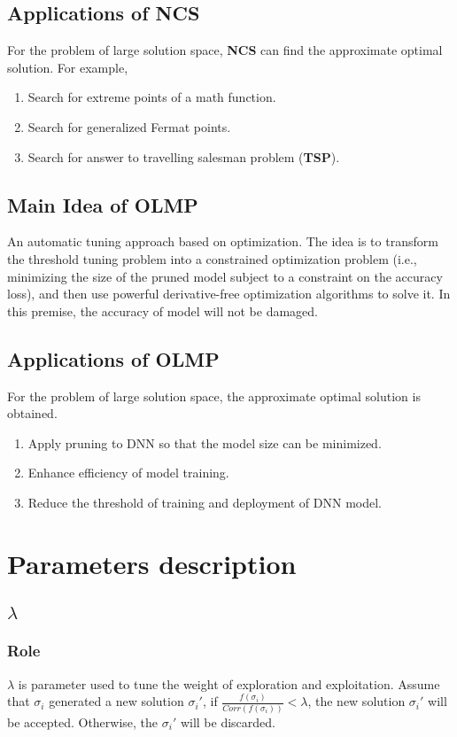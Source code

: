 \documentclass[lang=en,12pt]{elegantpaper}
\begin{document}
\subsection{Applications of NCS}
For the problem of large solution space, \textbf{NCS} can find the approximate optimal solution. For example,
\begin{enumerate}
  \item Search for extreme points of a math function.
  \item Search for generalized Fermat points.
  \item Search for answer to travelling salesman problem (\textbf{TSP}).
\end{enumerate}

\subsection{Main Idea of OLMP}
An automatic tuning approach based on optimization.
The idea is to transform the threshold tuning problem into a constrained optimization problem (i.e., minimizing the size of the pruned model subject to a constraint on the accuracy loss),
and then use powerful derivative-free optimization algorithms to solve it. In this premise, the accuracy of model will not be damaged.

\subsection{Applications of OLMP}
For the problem of large solution space, the approximate optimal solution is obtained.
\begin{enumerate}
  \item Apply pruning to DNN so that the model size can be minimized.
  \item Enhance efficiency of model training.
  \item Reduce the threshold of training and deployment of DNN model.
\end{enumerate}



\section{Parameters description}
\subsection{$\lambda$}
\subsubsection{Role}
$\lambda$ is parameter used to tune the weight of exploration and exploitation.
Assume that $\sigma_i$ generated a new solution $\sigma_i'$, if $\frac{f(\sigma_i)}{Corr(f(\sigma_i))} < \lambda$, the new solution $\sigma_i'$ will be accepted.
Otherwise, the $\sigma_i'$ will be discarded.
\end{document}
